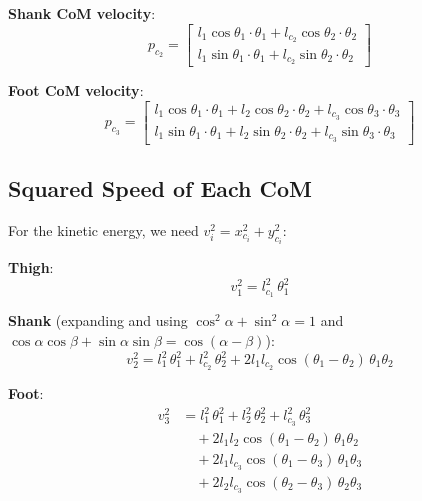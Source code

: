 \documentclass[11pt,a4paper]{article}
\newcommand{\vc}[1]{\bm{#1}}
\newcommand{\dt}[1]{\dot{#1}}
\def\vc#1{#1}%
\def\dt#1{#1}%
\def\bm#1{#1}%
\begin{document}
\textbf{Shank CoM velocity}:
\begin{equation}
\boxed{
    \dt{\vc{p}}_{c_2} = \begin{bmatrix}
        l_1 \cos\theta_1 \cdot \dt{\theta}_1 + l_{c_2} \cos\theta_2 \cdot \dt{\theta}_2 \\
        l_1 \sin\theta_1 \cdot \dt{\theta}_1 + l_{c_2} \sin\theta_2 \cdot \dt{\theta}_2
    \end{bmatrix}
}
\label{eq:vel_com2}
\end{equation}

\textbf{Foot CoM velocity}:
\begin{equation}
\boxed{
    \dt{\vc{p}}_{c_3} = \begin{bmatrix}
        l_1 \cos\theta_1 \cdot \dt{\theta}_1 + l_2 \cos\theta_2 \cdot \dt{\theta}_2 + l_{c_3} \cos\theta_3 \cdot \dt{\theta}_3 \\
        l_1 \sin\theta_1 \cdot \dt{\theta}_1 + l_2 \sin\theta_2 \cdot \dt{\theta}_2 + l_{c_3} \sin\theta_3 \cdot \dt{\theta}_3
    \end{bmatrix}
}
\label{eq:vel_com3}
\end{equation}

\subsection{Squared Speed of Each CoM}

For the kinetic energy, we need $v_i^2 = \dt{x}_{c_i}^2 + \dt{y}_{c_i}^2$:

\textbf{Thigh}:
\begin{equation}
    v_1^2 = l_{c_1}^2 \, \dt{\theta}_1^2
    \label{eq:v1sq}
\end{equation}

\textbf{Shank} (expanding and using $\cos^2\alpha + \sin^2\alpha = 1$ and
$\cos\alpha\cos\beta + \sin\alpha\sin\beta = \cos(\alpha - \beta)$):
\begin{equation}
    v_2^2 = l_1^2 \, \dt{\theta}_1^2 + l_{c_2}^2 \, \dt{\theta}_2^2
            + 2 l_1 l_{c_2} \cos(\theta_1 - \theta_2) \, \dt{\theta}_1 \dt{\theta}_2
    \label{eq:v2sq}
\end{equation}

\textbf{Foot}:
\begin{equation}
\boxed{
\begin{aligned}
    v_3^2 &= l_1^2 \, \dt{\theta}_1^2 + l_2^2 \, \dt{\theta}_2^2 + l_{c_3}^2 \, \dt{\theta}_3^2 \\
           &\quad + 2 l_1 l_2 \cos(\theta_1 - \theta_2) \, \dt{\theta}_1 \dt{\theta}_2 \\
           &\quad + 2 l_1 l_{c_3} \cos(\theta_1 - \theta_3) \, \dt{\theta}_1 \dt{\theta}_3 \\
           &\quad + 2 l_2 l_{c_3} \cos(\theta_2 - \theta_3) \, \dt{\theta}_2 \dt{\theta}_3
\end{aligned}
}
\label{eq:v3sq}
\end{equation}
\end{document}

